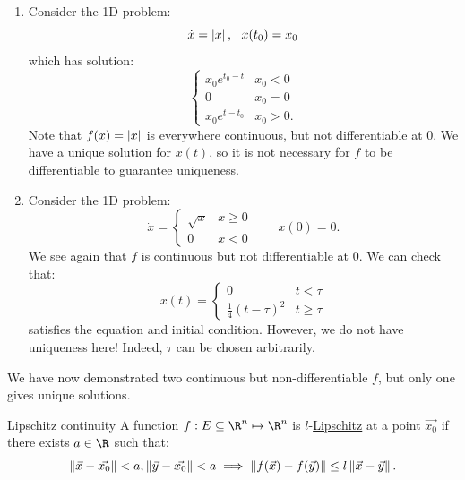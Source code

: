 \documentclass[../Main.tex]{subfiles}
\begin{document}
\begin{example}
    \begin{enumerate}
        \item Consider the 1D problem:
            \begin{equation*}
                \dot{x} = \left|x\right|,~~x(t_0) = x_0
            \end{equation*}
            which has solution:
            \begin{equation*}
                \begin{cases}
                    x_0 e^{t_0 - t} & x_0 < 0 \\
                    0 & x_0 = 0 \\
                    x_0 e^{t - t_0} & x_0 > 0.
                \end{cases}
            \end{equation*}
            Note that $f(x) = \left|x\right|$ is everywhere continuous, but not differentiable at $0$. We have a unique solution for $x(t)$, so it is not necessary for $f$ to be differentiable to guarantee uniqueness.
        \item Consider the 1D problem:
            \begin{equation*}
                \dot{x} =
                \begin{cases}
                    \sqrt{x} & x \geq 0 \\
                    0 & x < 0
                \end{cases}
                \qquad x(0) = 0.
            \end{equation*}
            We see again that $f$ is continuous but not differentiable at $0$. We can check that:
            \begin{equation*}
                x(t) =
                \begin{cases}
                    0 & t < \tau \\
                    \frac14 (t - \tau)^2 & t \geq \tau
                \end{cases}
            \end{equation*}
            satisfies the equation and initial condition. However, we do not have uniqueness here! Indeed, $\tau$ can be chosen arbitrarily.
    \end{enumerate}
    We have now demonstrated two continuous but non-differentiable $f$, but only one gives unique solutions.
\end{example}
\begin{definition}{Lipschitz continuity}
    A function $f : E \subseteq \R^n \mapsto \R^n$ is $l$-\underline{Lipschitz} at a point $\vec{x_0}$ if there exists $a \in \R$ such that:
    \begin{equation*}
        \left\|\vec{x} - \vec{x_0}\right\| < a, \left\|\vec{y} - \vec{x_0}\right\| < a \implies \left\|f(\vec{x}) - f(\vec{y})\right\| \leq l\left\|\vec{x} - \vec{y}\right\|.
    \end{equation*}
\end{definition}
\end{document}
